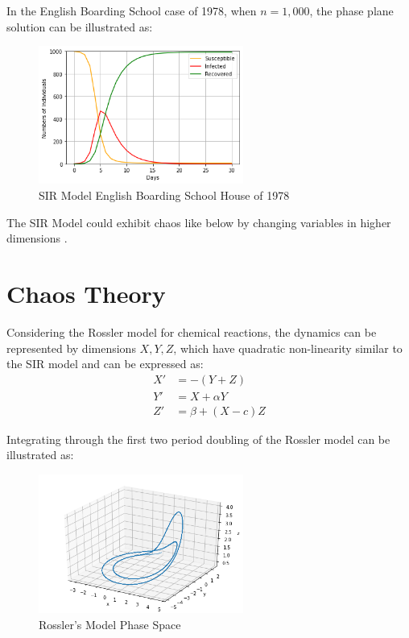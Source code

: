 \documentclass{article}
\begin{document}
\newpage
In the English Boarding School case of 1978, when $n = 1,000$, the phase plane solution can be illustrated as:

    \begin{figure}[h]
        \centering
        \includegraphics[width=0.6\textwidth]{1000.png}
        \caption{SIR Model English Boarding School House of 1978}
        \label{fig:sir_1000}
    \end{figure}

The SIR Model could exhibit chaos like below by changing variables in higher dimensions \cite{dynamics} \cite{subharm}.

\section*{Chaos Theory}

Considering the Rossler model for chemical reactions, the dynamics can be represented by dimensions $X, Y, Z$, which have quadratic non-linearity similar to the SIR model and can be expressed as:
    \begin{equation}
    \begin{split}
        X' & = -(Y + Z) \\
        Y' & = X + \alpha Y \\
        Z' & = \beta + (X - c) Z
    \end{split}
    \end{equation}

Integrating through the first two period doubling of the Rossler model can be illustrated as:
    
    \begin{figure}[h]
        \centering
        \includegraphics[width=0.6\textwidth]{rossler.png}
        \caption{Rossler's Model Phase Space \cite{moon}}
        \label{fig:rossler}
    \end{figure}
\end{document}
